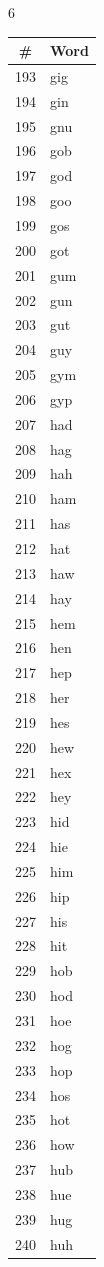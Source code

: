 \documentclass[11pt,a4paper]{article}
\begin{document}
\begin{multicols}{6}
\columnbreak

\begin{tabular}{cl}
\toprule
\# & Word \\
\midrule
193 & gig \\
194 & gin \\
195 & gnu \\
196 & gob \\
197 & god \\
198 & goo \\
199 & gos \\
200 & got \\
201 & gum \\
202 & gun \\
203 & gut \\
204 & guy \\
205 & gym \\
206 & gyp \\
207 & had \\
208 & hag \\
209 & hah \\
210 & ham \\
211 & has \\
212 & hat \\
213 & haw \\
214 & hay \\
215 & hem \\
216 & hen \\
217 & hep \\
218 & her \\
219 & hes \\
220 & hew \\
221 & hex \\
222 & hey \\
223 & hid \\
224 & hie \\
225 & him \\
226 & hip \\
227 & his \\
228 & hit \\
229 & hob \\
230 & hod \\
231 & hoe \\
232 & hog \\
233 & hop \\
234 & hos \\
235 & hot \\
236 & how \\
237 & hub \\
238 & hue \\
239 & hug \\
240 & huh \\
\bottomrule
\end{tabular}


\end{multicols}
\end{document}
